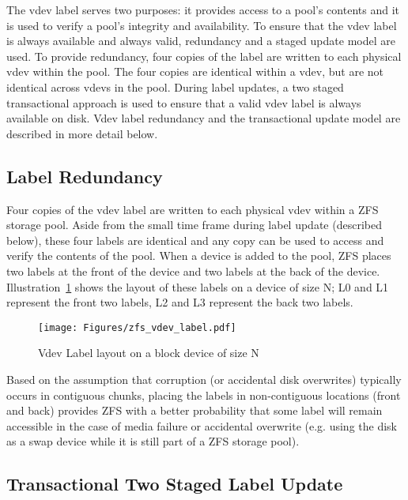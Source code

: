 The vdev label serves two purposes:
it provides access to a pool's contents
and it is used to verify a pool's integrity and availability.
To ensure that the vdev label is always available and always valid,
redundancy and a staged update model are used.
To provide redundancy,
four copies of the label are written to each physical vdev within the pool.
The four copies are identical within a vdev,
but are not identical across vdevs in the pool.
During label updates,
a two staged transactional approach is used to ensure that
a valid vdev label is always available on disk.
Vdev label redundancy and the transactional update model are described in more detail below.

\subsection{Label Redundancy}

Four copies of the vdev label are written to each physical vdev within a ZFS storage pool.
Aside from the small time frame during label update (described below),
these four labels are identical
and any copy can be used to access and verify the contents of the pool.
When a device is added to the pool,
ZFS places two labels at the front of the device and two labels at the back of the device.
Illustration~\ref{fig:vdev_label} shows the layout of these labels on a device of size N;
L0 and L1 represent the front two labels,
L2 and L3 represent the back two labels.

\begin{figure}[hb]
  \centering
  \texttt{[image: Figures/zfs\_vdev\_label.pdf]}
  \caption{Vdev Label layout on a block device of size N}
  \label{fig:vdev_label}
\end{figure}

Based on the assumption that
corruption (or accidental disk overwrites) typically occurs in contiguous chunks,
placing the labels in non-contiguous locations (front and back) provides ZFS with a better probability
that some label will remain accessible in the case of media failure or accidental overwrite
(e.g. using the disk as a swap device while it is still part of a ZFS storage pool).

\subsection{Transactional Two Staged Label Update}

